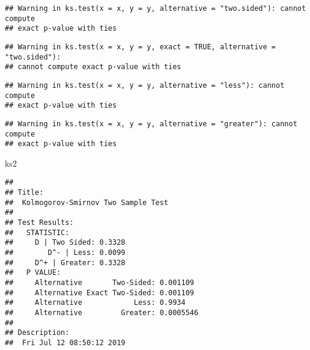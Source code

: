 \documentclass[]{article}
\newenvironment{Shaded}{\begin{snugshade}}{\end{snugshade}}
\newcommand{\CommentTok}[1]{\textcolor[rgb]{0.56,0.35,0.01}{\textit{#1}}}
\newcommand{\KeywordTok}[1]{\textcolor[rgb]{0.13,0.29,0.53}{\textbf{#1}}}
\newcommand{\NormalTok}[1]{#1}
\newcommand{\OperatorTok}[1]{\textcolor[rgb]{0.81,0.36,0.00}{\textbf{#1}}}
\newcommand{\StringTok}[1]{\textcolor[rgb]{0.31,0.60,0.02}{#1}}
\begin{document}
\begin{Shaded}
\end{Shaded}

\begin{verbatim}
## Warning in ks.test(x = x, y = y, alternative = "two.sided"): cannot compute
## exact p-value with ties
\end{verbatim}

\begin{verbatim}
## Warning in ks.test(x = x, y = y, exact = TRUE, alternative = "two.sided"):
## cannot compute exact p-value with ties
\end{verbatim}

\begin{verbatim}
## Warning in ks.test(x = x, y = y, alternative = "less"): cannot compute
## exact p-value with ties
\end{verbatim}

\begin{verbatim}
## Warning in ks.test(x = x, y = y, alternative = "greater"): cannot compute
## exact p-value with ties
\end{verbatim}

\begin{Shaded}
\begin{Highlighting}[]
\NormalTok{ks2}
\end{Highlighting}
\end{Shaded}

\begin{verbatim}
## 
## Title:
##  Kolmogorov-Smirnov Two Sample Test
## 
## Test Results:
##   STATISTIC:
##     D | Two Sided: 0.3328
##        D^- | Less: 0.0099
##     D^+ | Greater: 0.3328
##   P VALUE:
##     Alternative       Two-Sided: 0.001109 
##     Alternative Exact Two-Sided: 0.001109 
##     Alternative            Less: 0.9934 
##     Alternative         Greater: 0.0005546 
## 
## Description:
##  Fri Jul 12 08:50:12 2019
\end{verbatim}

\begin{Shaded}
\end{Shaded}
\end{document}
